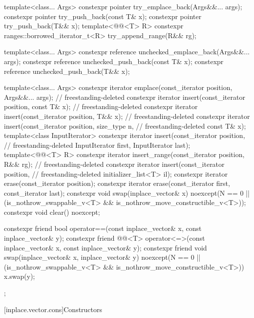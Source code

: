 \begin{codeblock}
{{    template<class... Args>
      constexpr pointer try_emplace_back(Args&&... args);
    constexpr pointer try_push_back(const T& x);
    constexpr pointer try_push_back(T&& x);
    template<@@<T> R>
      constexpr ranges::borrowed_iterator_t<R> try_append_range(R&& rg);

    template<class... Args>
      constexpr reference unchecked_emplace_back(Args&&... args);
    constexpr reference unchecked_push_back(const T& x);
    constexpr reference unchecked_push_back(T&& x);

    template<class... Args>
      constexpr iterator emplace(const_iterator position, Args&&... args);  // freestanding-deleted
    constexpr iterator insert(const_iterator position, const T& x);         // freestanding-deleted
    constexpr iterator insert(const_iterator position, T&& x);              // freestanding-deleted
    constexpr iterator insert(const_iterator position, size_type n,         // freestanding-deleted
                              const T& x);
    template<class InputIterator>
      constexpr iterator insert(const_iterator position,                    // freestanding-deleted
                                InputIterator first, InputIterator last);
    template<@@<T> R>
      constexpr iterator insert_range(const_iterator position, R&& rg);     // freestanding-deleted
    constexpr iterator insert(const_iterator position,                      // freestanding-deleted
                              initializer_list<T> il);
    constexpr iterator erase(const_iterator position);
    constexpr iterator erase(const_iterator first, const_iterator last);
    constexpr void swap(inplace_vector& x)
      noexcept(N == 0 || (is_nothrow_swappable_v<T> &&
                          is_nothrow_move_constructible_v<T>));
    constexpr void clear() noexcept;

    constexpr friend bool operator==(const inplace_vector& x,
                                     const inplace_vector& y);
    constexpr friend @@<T>
      operator<=>(const inplace_vector& x, const inplace_vector& y);
    constexpr friend void swap(inplace_vector& x, inplace_vector& y)
      noexcept(N == 0 || (is_nothrow_swappable_v<T> &&
                          is_nothrow_move_constructible_v<T>))
      { x.swap(y); }
  };
}
\end{codeblock}

[inplace.vector.cons]{Constructors}

